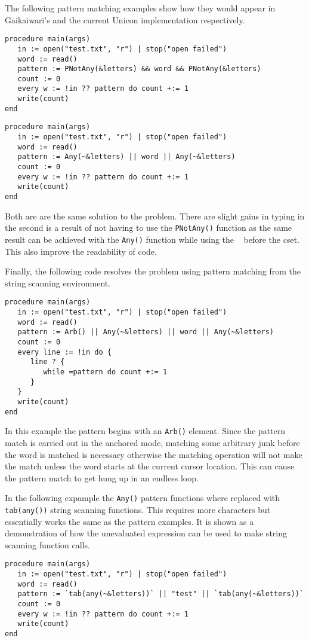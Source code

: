 \documentclass{article}
\begin{document}
The following pattern matching examples show how they would appear in Gaikaiwari's and the current Unicon implementation respectively.
\begin{verbatim}
procedure main(args)
   in := open("test.txt", "r") | stop("open failed")
   word := read()
   pattern := PNotAny(&letters) && word && PNotAny(&letters)
   count := 0
   every w := !in ?? pattern do count +:= 1
   write(count)
end
\end{verbatim}

\begin{verbatim}
procedure main(args)
   in := open("test.txt", "r") | stop("open failed")
   word := read()
   pattern := Any(~&letters) || word || Any(~&letters)
   count := 0
   every w := !in ?? pattern do count +:= 1
   write(count)
end
\end{verbatim}
Both are are the same solution to the problem.  There are slight gains in typing in the second is a result of not having to use the \texttt{PNotAny()} function as the same result can be achieved with the \texttt{Any()} function while using the \texttt{~} before the cset.  This also improve the readability of code.

Finally, the following code resolves the problem using pattern matching from the string scanning environment.
\begin{verbatim}
procedure main(args)
   in := open("test.txt", "r") | stop("open failed")
   word := read()
   pattern := Arb() || Any(~&letters) || word || Any(~&letters)
   count := 0
   every line := !in do {
      line ? {
         while =pattern do count +:= 1
      }
   }
   write(count)
end
\end{verbatim}
In this example the pattern begins with an \texttt{Arb()} element.  Since the pattern match is carried out in the anchored mode, matching some arbitrary junk before the word is matched is necessary otherwise the matching operation will not make the match unless the word starts at the current cursor location.  This can cause the pattern match to get hung up in an endless loop.

In the following expample the \texttt{Any()} pattern functions where replaced with \texttt{tab(any())} string scanning functions.  This requires more characters but essentially works the same as the pattern examples.  It is shown as a demonstration of how the unevaluated expression can be used to make string scanning function calls.
\begin{verbatim}
procedure main(args)
   in := open("test.txt", "r") | stop("open failed")
   word := read()
   pattern := `tab(any(~&letters))` || "test" || `tab(any(~&letters))`
   count := 0
   every w := !in ?? pattern do count +:= 1
   write(count)
end
\end{verbatim}
\end{document}
